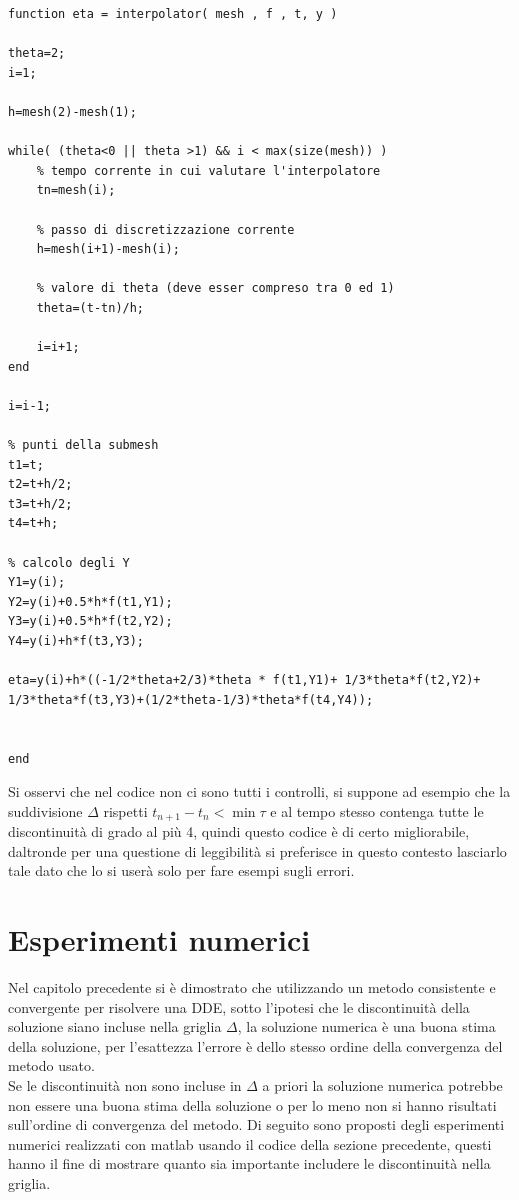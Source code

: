 \begin{lstlisting}[breaklines,caption={Interpolatore del metodo}]
function eta = interpolator( mesh , f , t, y )

theta=2;
i=1;

h=mesh(2)-mesh(1);

while( (theta<0 || theta >1) && i < max(size(mesh)) )
    % tempo corrente in cui valutare l'interpolatore
    tn=mesh(i);
    
    % passo di discretizzazione corrente
    h=mesh(i+1)-mesh(i);
    
    % valore di theta (deve esser compreso tra 0 ed 1)
    theta=(t-tn)/h;
    
    i=i+1;
end

i=i-1;

% punti della submesh
t1=t;
t2=t+h/2;
t3=t+h/2;
t4=t+h;
    
% calcolo degli Y
Y1=y(i);
Y2=y(i)+0.5*h*f(t1,Y1);
Y3=y(i)+0.5*h*f(t2,Y2);
Y4=y(i)+h*f(t3,Y3);
    
eta=y(i)+h*((-1/2*theta+2/3)*theta * f(t1,Y1)+ 1/3*theta*f(t2,Y2)+ 1/3*theta*f(t3,Y3)+(1/2*theta-1/3)*theta*f(t4,Y4));


end
\end{lstlisting}
\vspace{1cm}
Si osservi che nel codice non ci sono tutti i controlli, si suppone ad esempio che la suddivisione $\Delta$ rispetti 
$t_{n+1}-t_n < \min \tau$ e al tempo stesso contenga tutte le discontinuità di grado al più 4, quindi questo codice è di certo migliorabile, daltronde 
per una questione di leggibilità si preferisce in questo contesto lasciarlo tale dato che lo si userà solo per fare esempi sugli errori.



\section{Esperimenti numerici}
Nel capitolo precedente si è dimostrato che utilizzando un metodo consistente e convergente per risolvere una DDE, sotto l'ipotesi 
che le discontinuità della soluzione siano incluse nella griglia $\Delta$, la soluzione numerica è una buona stima della soluzione, per 
l'esattezza l'errore è dello stesso ordine della convergenza del metodo usato.
\vspace{0.5cm}\\
Se le discontinuità non sono incluse in $\Delta$ a priori la soluzione numerica potrebbe non essere 
una buona stima della soluzione o per lo meno non si hanno risultati sull'ordine di convergenza del metodo.
Di seguito sono proposti degli esperimenti numerici realizzati con matlab usando il codice della sezione precedente,
 questi hanno il fine di mostrare quanto sia importante includere 
le discontinuità nella griglia.

